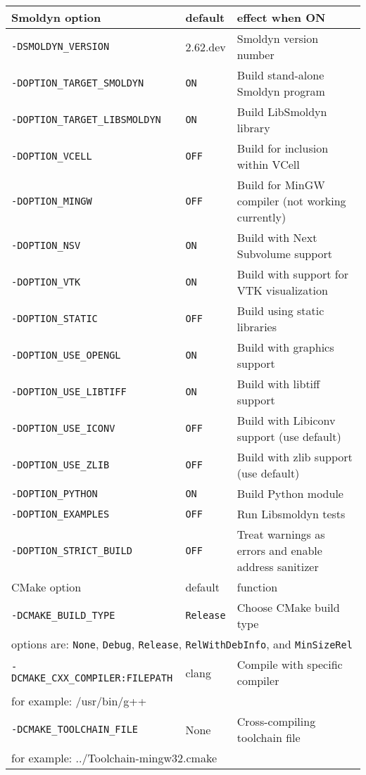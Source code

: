 \documentclass {book}
\begin{document}
\begin{longtable}[c]{lll}
Smoldyn option & default & effect when ON\\
\hline
\texttt{-DSMOLDYN\_VERSION} & 2.62.dev & Smoldyn version number\\
\texttt{-DOPTION\_TARGET\_SMOLDYN} & \texttt{ON} & Build stand-alone Smoldyn program\\
\texttt{-DOPTION\_TARGET\_LIBSMOLDYN} & \texttt{ON} & Build LibSmoldyn library\\
\texttt{-DOPTION\_VCELL} & \texttt{OFF} & Build for inclusion within VCell\\
\texttt{-DOPTION\_MINGW} & \texttt{OFF} & Build for MinGW compiler (not working currently)\\
\texttt{-DOPTION\_NSV} & \texttt{ON} & Build with Next Subvolume support\\
\texttt{-DOPTION\_VTK} & \texttt{ON} & Build with support for VTK visualization\\
\texttt{-DOPTION\_STATIC} & \texttt{OFF} & Build using static libraries\\
\texttt{-DOPTION\_USE\_OPENGL} & \texttt{ON} & Build with graphics support\\
\texttt{-DOPTION\_USE\_LIBTIFF} & \texttt{ON} & Build with libtiff support\\
\texttt{-DOPTION\_USE\_ICONV} & \texttt{OFF} & Build with Libiconv support (use default)\\
\texttt{-DOPTION\_USE\_ZLIB} & \texttt{OFF} & Build with zlib support (use default)\\
\texttt{-DOPTION\_PYTHON} & \texttt{ON} & Build Python module\\
\texttt{-DOPTION\_EXAMPLES} & \texttt{OFF} & Run Libsmoldyn tests\\
\texttt{-DOPTION\_STRICT\_BUILD} & \texttt{OFF} & Treat warnings as errors and enable address sanitizer\\
\hline
CMake option & default & function\\
\hline
\texttt{-DCMAKE\_BUILD\_TYPE} & \texttt{Release} & Choose CMake build type\\
\multicolumn{3}{l}{\hspace{0.3in}options are: \texttt{None}, \texttt{Debug}, \texttt{Release}, \texttt{RelWithDebInfo}, and \texttt{MinSizeRel}}\\
\texttt{-DCMAKE\_CXX\_COMPILER:FILEPATH} & clang & Compile with specific compiler\\
\multicolumn{3}{l}{\hspace{0.3in}for example: /usr/bin/g++}\\
\texttt{-DCMAKE\_TOOLCHAIN\_FILE} & None & Cross-compiling toolchain file \\
\multicolumn{3}{l}{\hspace{0.3in}for example: ../Toolchain-mingw32.cmake}\\
\end{longtable}
\end{document}
